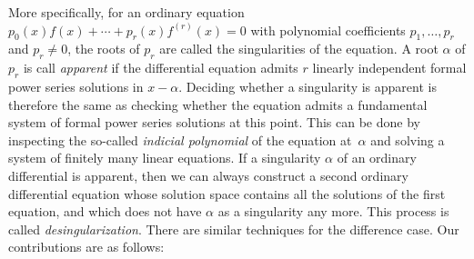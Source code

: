 \documentclass[10pt,a4paper]{article}
\begin{document}
More specifically, for an ordinary equation $p_0(x)f(x) + \cdots + p_r(x)f^{(r)}(x) = 0$ with
polynomial coefficients $p_1,\dots,p_r$ and $p_r\neq0$, the roots of $p_r$ are called the
singularities of the equation. A root $\alpha$ of $p_r$ is call \emph{apparent} if the
differential equation admits $r$ linearly independent formal power series solutions in 
$x - \alpha$. Deciding whether a singularity is apparent is therefore the same as
checking whether the equation admits a fundamental system of formal power series
solutions at this point. This can be done by inspecting the so-called
\emph{indicial polynomial} of the equation at~$\alpha$ and solving a system of finitely many linear equations. 
If a singularity $\alpha$ of an ordinary differential is apparent, then we can always 
construct a second ordinary differential equation whose solution space contains all the solutions of the
first equation, and which does not have $\alpha$ as a singularity any more. 
This process is called \emph{desingularization}.  There are similar techniques for the difference case. 
Our contributions are as follows: 
\end{document}
